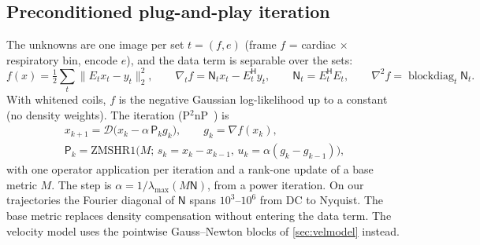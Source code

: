 \documentclass[11pt]{article}
\theoremstyle{remark}
\newcommand{\Nop}{\mathsf N}
\newcommand{\herm}{\mathsf H}
\begin{document}
\subsection{Preconditioned plug-and-play iteration}
\label{sec:iteration}

The unknowns are one image per set $t=(f,e)$ (frame $f$ = cardiac $\times$ respiratory bin, encode $e$), and the data term is separable over the sets:
\begin{equation}
  f(x)=\tfrac12\sum_t\|E_tx_t-y_t\|_2^2,\qquad \nabla_tf=\Nop_tx_t-E_t^\herm y_t,\qquad \Nop_t=E_t^\herm E_t,\qquad \nabla^2f=\operatorname{blockdiag}_t\Nop_t .
  \label{eq:datafit}
\end{equation}
With whitened coils, $f$ is the negative Gaussian log-likelihood up to a constant (no density weights).
The iteration (P$^2$nP~\cite{hong2024}) is
\begin{equation}
\begin{gathered}
  x_{k+1}=\mathcal D\bigl(x_k-\alpha\,\mathsf P_kg_k\bigr),\qquad g_k=\nabla f(x_k),\\
  \mathsf P_k=\text{ZMSHR1}\bigl(M;\,s_k=x_k-x_{k-1},\,u_k=\alpha(g_k-g_{k-1})\bigr),
\end{gathered}
  \label{eq:pnp}
\end{equation}
with one operator application per iteration and a rank-one update of a base metric $M$.
The step is $\alpha=1/\lambda_{\max}(M\Nop)$, from a power iteration.
On our trajectories the Fourier diagonal of $\Nop$ spans $10^3$--$10^6$ from DC to Nyquist. The base metric replaces density compensation without entering the data term.
The velocity model uses the pointwise Gauss--Newton blocks of \cref{sec:velmodel} instead.
\end{document}
